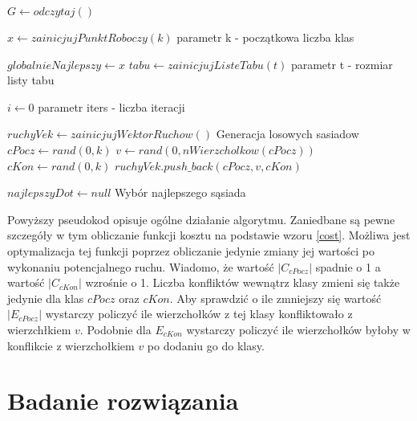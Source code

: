 \documentclass[12pt,a4paper]{article}
\begin{document}
\begin{algorithmic}

\State $G\gets odczytaj()$

\State $x\gets zainicjujPunktRoboczy(k)$
\Comment parametr k - początkowa liczba klas

\State $globalnieNajlepszy \gets x$
\State $tabu\gets zainicjujListeTabu(t)$
\Comment parametr t - rozmiar listy tabu

\State $i\gets 0$
\Comment parametr iters - liczba iteracji

\State $ruchyVek \gets zainicjujWektorRuchow()$
\Comment Generacja losowych sasiadow
\State $cPocz \gets rand(0, k)$
\State $v \gets rand(0, nWierzcholkow(cPocz))$
\State $cKon \gets rand(0, k)$
\State $ruchyVek.push\_back(cPocz, v, cKon)$
\EndFor

\State $najlepszyDot \gets null$
\Comment Wybór najlepszego sąsiada
\EndIf
\EndFor


\EndIf

\EndWhile
{}
\end{algorithmic}

Powyższy pseudokod opisuje ogólne działanie algorytmu. Zaniedbane są pewne szczegóły w tym obliczanie funkcji kosztu na podstawie wzoru \ref{cost}. Możliwa jest optymalizacja tej funkcji poprzez obliczanie jedynie zmiany jej wartości po wykonaniu potencjalnego ruchu. Wiadomo, że wartość $|C_{cPocz}|$ spadnie o 1 a wartość $|C_{cKon}|$ wzrośnie o 1. Liczba konfliktów wewnątrz klasy zmieni się także jedynie dla klas $cPocz$ oraz $cKon$. Aby sprawdzić o ile zmniejszy się wartość $|E_{cPocz}|$ wystarczy policzyć ile wierzchołków z tej klasy konfliktowało z wierzchłkiem $v$. Podobnie dla $E_{cKon}$ wystarczy policzyć ile wierzchołków byłoby w konflikcie z wierzchołkiem $v$ po dodaniu go do klasy.


\section{Badanie rozwiązania}
\end{document}

